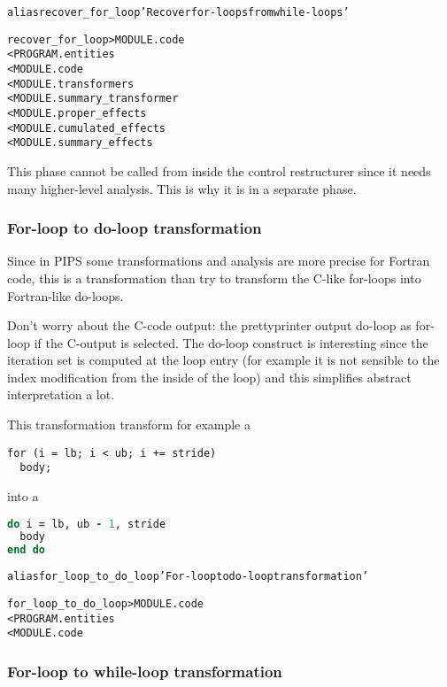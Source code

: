 \documentclass[a4paper]{report}
\newenvironment{PipsMake}{\begin{alltt}}{\end{alltt}}
\newenvironment{PipsPass}[1]{\label{pass:#1}}{}
\begin{document}
\begin{PipsMake}
alias recover_for_loop 'Recover for-loops from while-loops'

recover_for_loop          > MODULE.code
        < PROGRAM.entities
        < MODULE.code
        < MODULE.transformers
        < MODULE.summary_transformer
        < MODULE.proper_effects
        < MODULE.cumulated_effects
        < MODULE.summary_effects
\end{PipsMake}

This phase cannot be called from inside the control restructurer since it
needs many higher-level analysis. This is why it is in a separate phase.

\subsubsection{For-loop to do-loop transformation}
\label{sec:loop-do-loop}

\begin{PipsPass}{for_loop_to_do_loop}
Since in PIPS some transformations and analysis are more precise for
Fortran code, this is a transformation than try to transform the C-like
for-loops into Fortran-like do-loops.
\end{PipsPass}

Don't worry about the C-code output:
the prettyprinter output do-loop as for-loop if the C-output is selected.
The do-loop construct is interesting since the iteration set is computed
at the loop entry (for example it is not sensible to the index
modification from the inside of the loop) and this simplifies abstract
interpretation a lot.

This transformation transform for example a
\begin{lstlisting}
for (i = lb; i < ub; i += stride)
  body;
\end{lstlisting}
into a
\begin{lstlisting}[language=fortran]
do i = lb, ub - 1, stride
  body
end do
\end{lstlisting}

\begin{PipsMake}
alias for_loop_to_do_loop 'For-loop to do-loop transformation'

for_loop_to_do_loop          > MODULE.code
        < PROGRAM.entities
        < MODULE.code
\end{PipsMake}


\subsubsection{For-loop to while-loop transformation}
\label{sec:loop-while-loop}
\end{document}
